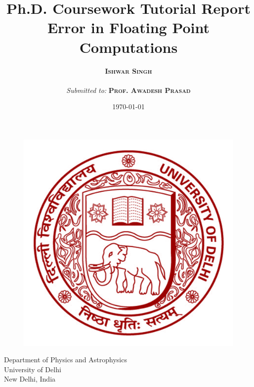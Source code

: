 \documentclass[a4,12pt]{article}
\numberwithin{equation}{subsection}
\begin{document}
\begin{titlepage}
    \begin{center}
        \title{\textbf{Ph.D. Coursework Tutorial Report} \\ Error in Floating Point Computations}
        \vspace{1.5cm}
		\author{\textsc{\textbf{Ishwar Singh}}\\ \\ \textit{ Submitted to:} \textsc{\textbf{Prof. Awadesh Prasad}}}
		\vspace{0.7cm}
		\date{\today}
		\maketitle
		\thispagestyle{empty}
				\begin{figure}[H]
				\begin{center}
        \includegraphics[scale=0.4]{University_of_delhi_logo.png}
				\end{center}
				\end{figure}
       	\vspace{0.8cm}
       	\begin{center}
        Department of Physics and Astrophysics\\
        University of Delhi\\
        New Delhi, India\\
				\end{center}


    \end{center}
\end{titlepage}
\printnomenclature[3em]
\tableofcontents
\thispagestyle{empty}
\listoffigures
\thispagestyle{empty}
\newpage
\clearpage
\pagebreak
\setcounter{page}{1}
\end{document}
